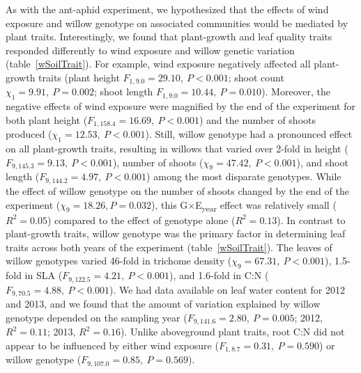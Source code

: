 \documentclass[11pt]{article}
\begin{document}
As with the ant-aphid experiment, we hypothesized that the effects of
wind exposure and willow genotype on associated communities would be
mediated by plant traits. Interestingly, we found that plant-growth and
leaf quality traits responded differently to wind exposure and willow
genetic variation (table~\ref{wSoilTrait}). For example, wind exposure negatively
affected all plant-growth traits (plant height \(F_{1,9.0}=29.10,\ P<0.001\); shoot
count \(\chi_1=9.91,\ P=0.002\); shoot length \(F_{1,9.0}=10.44,\ P=0.010\)). Moreover, the
negative effects of wind exposure were magnified by the end of the
experiment for both plant height (\(F_{1,158.4}=16.69,\ P<0.001\)) and the number of
shoots produced (\(\chi_1=12.53,\ P<0.001\)). Still, willow genotype had a
pronounced effect on all plant-growth traits, resulting in willows that
varied over 2-fold in height (\(F_{9,145.3}=9.13,\ P<0.001\)), number of shoots
(\(\chi_9=47.42,\ P<0.001\)), and shoot length (\(F_{9,144.2}=4.97,\ P<0.001\)) among the most
disparate genotypes. While the effect of willow genotype on the number
of shoots changed by the end of the experiment (\(\chi_9=18.26, P = 0.032\)),
this G$\times$E\textsubscript{year} effect was relatively small (\(R^2=0.05\))
compared to the effect of genotype alone (\(R^2=0.13\)). In
contrast to plant-growth traits, willow genotype was the primary factor
in determining leaf traits across both years of the experiment (table~\ref{wSoilTrait}). The leaves of willow genotypes varied 46-fold in trichome density
(\(\chi_9=67.31,\ P<0.001\)), 1.5-fold in SLA (\(F_{9,122.5}=4.21,\ P<0.001\)), and 1.6-fold
in C:N (\(F_{9,70.5}=4.88,\ P<0.001\)). We had data available on leaf water content
for 2012 and 2013, and we found that the amount of variation explained
by willow genotype depended on the sampling year (\(F_{9,141.6}=2.80,\ P=0.005\);
2012, \(R^2=0.11\); 2013, \(R^2=0.16\)). Unlike aboveground
plant traits, root C:N did not appear to be influenced by either wind
exposure (\(F_{1,8.7}=0.31,\ P=0.590\)) or willow genotype (\(F_{9,107.0}=0.85,\ P=0.569\)).
\end{document}
